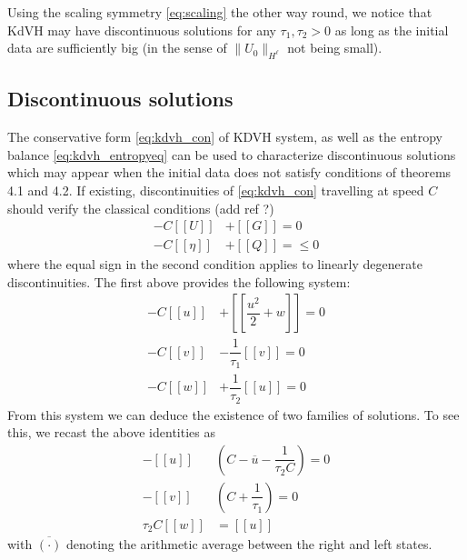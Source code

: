 \documentclass{article}
\theoremstyle{plain}
\theoremstyle{definition}
\numberwithin{theorem}{section}
\begin{document}
Using the scaling symmetry \eqref{eq:scaling} the other way round, we notice that KdVH may have discontinuous solutions for any $\tau_1, \tau_2 > 0$ as long as the initial data are sufficiently big (in the sense of $\| U_0 \|_{H^\ell}$ not being small).


\subsection{Discontinuous solutions}


The conservative form \eqref{eq:kdvh_con} of KDVH system, as well as the entropy balance \eqref{eq:kdvh_entropyeq} can be used to characterize
discontinuous solutions which may appear when the initial data  does not satisfy conditions of theorems 4.1 and 4.2.  If existing,  discontinuities of \eqref{eq:kdvh_con}
travelling at  speed $C$  should verify the classical conditions  (add ref ?)
\begin{equation}\label{eq:shock-conditions}
\begin{aligned}
-C [\![ U]\!] & +  [\![ G]\!] =0 \\[5pt]
-C [\![ \eta]\!] & +  [\![ Q]\!] = \le 0
\end{aligned}
\end{equation}
where  the equal sign in the second condition applies to  linearly degenerate  discontinuities. The first above provides the following system:
\begin{equation}
\begin{aligned}
-C [\![ u]\!] & +  [\![  \dfrac{u^2}{2} + w]\!] =0 \\[5pt]
-C [\![ v]\!] & -\dfrac{1}{\tau_1}  [\![   v]\!] =0 \\[5pt]
-C [\![ w]\!] & +\dfrac{1}{\tau_2}  [\![  u]\!] =0
\end{aligned}
\end{equation}
From this system we can  deduce the existence of two families of solutions. To see this, we recast the above identities as
\begin{equation}\label{eq:RH}
\begin{aligned}
-  [\![ u]\!]  &( C- { \overline u} -\dfrac{1}{\tau_2 C}    )=0   \\[5pt]
-  [\![ v]\!]  &( C+ \dfrac{1}{\tau_1}  )=0   \\[5pt]
\tau_2 C  [\![ w]\!] & =   [\![ u]\!]
\end{aligned}
\end{equation}
with $\overline{(\cdot)}$ denoting the arithmetic average between the right and left states.
\end{document}
